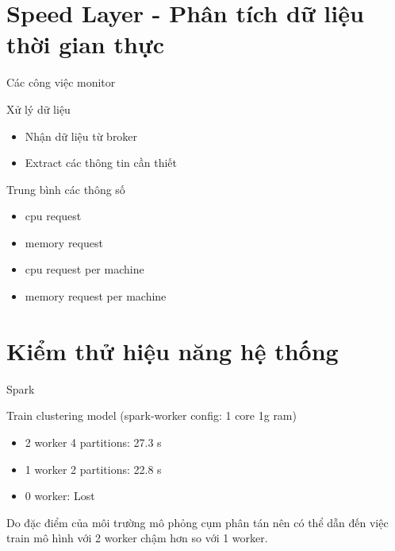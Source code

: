 \documentclass[10pt,xcolor={dvipsnames}]{beamer}
\begin{document}
	\section{Speed Layer - Phân tích dữ liệu thời gian thực} 
	
	\begin{frame}
	{Các công việc monitor}
		\begin{block}
		{Xử lý dữ liệu}
		\begin{itemize}
			\item Nhận dữ liệu từ broker
			\item Extract các thông tin cần thiết
		\end{itemize}
		\end{block}
		
		\begin{block}
		{Trung bình các thông số}
		\begin{itemize}
			\item cpu request
			\item memory request
			\item cpu request per machine
			\item memory request per machine
		\end{itemize}
		\end{block}
	\end{frame}
	
	\section{Kiểm thử hiệu năng hệ thống}
	
	\begin{frame}
	{Spark}
		\begin{block}
		{Train clustering model (spark-worker config: 1 core 1g ram)}
		\begin{itemize}
			\item 2 worker 4 partitions: 27.3 s 
			\item 1 worker 2 partitions: 22.8 s
			\item 0 worker: Lost
		\end{itemize}
		Do đặc điểm của môi trường mô phỏng cụm phân tán nên có thể dẫn đến việc train mô hình với 2 worker chậm hơn so với 1 worker.
		\end{block}
	\end{frame}
	
\end{document}
